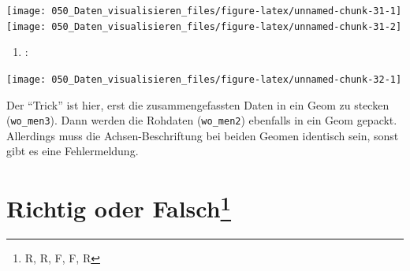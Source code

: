 \documentclass[12pt,ngerman,]{book}
\makeatletter
\newenvironment{Shaded}{\begin{snugshade}}{\end{snugshade}}
\newcommand{\KeywordTok}[1]{\textcolor[rgb]{0.13,0.29,0.53}{\textbf{#1}}}
\newcommand{\DataTypeTok}[1]{\textcolor[rgb]{0.13,0.29,0.53}{#1}}
\newcommand{\DecValTok}[1]{\textcolor[rgb]{0.00,0.00,0.81}{#1}}
\newcommand{\StringTok}[1]{\textcolor[rgb]{0.31,0.60,0.02}{#1}}
\newcommand{\OperatorTok}[1]{\textcolor[rgb]{0.81,0.36,0.00}{\textbf{#1}}}
\newcommand{\NormalTok}[1]{#1}
\providecommand{\tightlist}{%
  \setlength{\itemsep}{0pt}\setlength{\parskip}{0pt}}
\let\rmarkdownfootnote\footnote%
\def\footnote{\protect\rmarkdownfootnote}
\newenvironment{kframe}{%
\medskip{}
\setlength{\fboxsep}{.8em}
 \def\at@end@of@kframe{}%
 \ifinner\ifhmode%
  \def\at@end@of@kframe{\end{minipage}}%
  \begin{minipage}{\columnwidth}%
 \fi\fi%
 \def\FrameCommand##1{\hskip\@totalleftmargin \hskip-\fboxsep
 \colorbox{shadecolor}{##1}\hskip-\fboxsep
     \hskip-\linewidth \hskip-\@totalleftmargin \hskip\columnwidth}%
 \MakeFramed {\advance\hsize-\width
   \@totalleftmargin\z@ \linewidth\hsize
   \@setminipage}}%
 {\par\unskip\endMakeFramed%
 \at@end@of@kframe}
\renewenvironment{Shaded}{\begin{kframe}}{\end{kframe}}
\theoremstyle{definition}
\theoremstyle{definition}
\theoremstyle{remark}
\makeatother
\begin{document}
\begin{center}\texttt{[image: 050\_Daten\_visualisieren\_files/figure-latex/unnamed-chunk-31-1]} \texttt{[image: 050\_Daten\_visualisieren\_files/figure-latex/unnamed-chunk-31-2]} \end{center}

\begin{enumerate}
\def\labelenumi{\arabic{enumi}.}
\setcounter{enumi}{3}
\tightlist
\item
  :
\end{enumerate}

\begin{Shaded}
\end{Shaded}

\begin{center}\texttt{[image: 050\_Daten\_visualisieren\_files/figure-latex/unnamed-chunk-32-1]} \end{center}

Der ``Trick'' ist hier, erst die zusammengefassten Daten in ein Geom zu
stecken (\texttt{wo\_men3}). Dann werden die Rohdaten
(\texttt{wo\_men2}) ebenfalls in ein Geom gepackt. Allerdings muss die
Achsen-Beschriftung bei beiden Geomen identisch sein, sonst gibt es eine
Fehlermeldung.

\section[Richtig oder Falsch]{\texorpdfstring{Richtig oder
Falsch\footnote{R, R, F, F, R}}{Richtig oder Falsch}}\label{richtig-oder-falsch}
\end{document}
